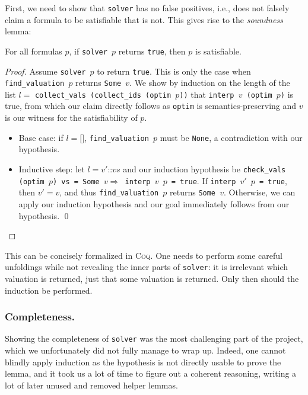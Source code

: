 First, we need to show that \texttt{solver} has no false positives, i.e., does not falsely claim a formula to be satisfiable that is not.
This gives rise to the \emph{soundness} lemma:
\begin{lemma}
    For all formulas $p$, if \texttt{solver $p$} returns \texttt{true}, then $p$ is satisfiable.
\end{lemma}
\begin{proof}
    Assume \texttt{solver $p$} to return \texttt{true}.
    This is only the case when \texttt{find\_valuation $p$} returns \texttt{Some $v$}.
    We show by induction on the length of the list $l =$ \texttt{collect\_vals (collect\_ids (optim $p$))} that \texttt{interp $v$ (optim $p$)} is true, from which our claim directly follows as \texttt{optim} is semantics-preserving and $v$ is our witness for the satisfiability of $p$.
    \begin{itemize}
        \item Base case: if $l = \texttt{[]}$, \texttt{find\_valuation $p$} must be \texttt{None}, a contradiction with our hypothesis.
        \item Inductive step: let $l = \texttt{$v'$::$vs$}$ and our induction hypothesis be \texttt{check\_vals (optim $p$) vs = Some $v \Longrightarrow$ interp $v$ $p$ = true}.
        If \texttt{interp $v'$ $p$ = true}, then $v' = v$, and thus \texttt{find\_valuation $p$} returns \texttt{Some $v$}.
        Otherwise, we can apply our induction hypothesis and our goal immediately follows from our hypothesis. \qed
    \end{itemize}
\end{proof}
This can be concisely formalized in \textsc{Coq}.
One needs to perform some careful unfoldings while not revealing the inner parts of \texttt{solver}: it is irrelevant which valuation is returned, just that some valuation is returned.
Only then should the induction be performed.

\subsubsection{Completeness.}

Showing the completeness of \texttt{solver} was the most challenging part of the project, which we unfortunately did not fully manage to wrap up.
Indeed, one cannot blindly apply induction as the hypothesis is not directly usable to prove the lemma, and it took us a lot of time to figure out a coherent reasoning, writing a lot of later unused and removed helper lemmas.

